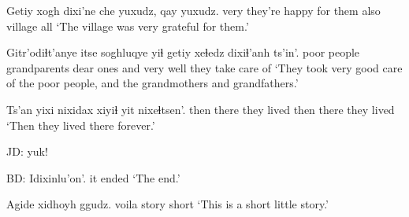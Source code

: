\documentclass[12pt]{article}
\begin{document}
\gll Getiy {xogh dixi'ne}           che yuxudz, qay yuxudz.
very  {they're happy for them} also  {}   village all
\glt `The village was very grateful for them.'
\glend

\gll Gitr'odiɬt'anye itse                          soghluqye yiɬ  getiy xeɬedz dixiɬ'anh ts'in'.
{poor people}   grandparents {dear ones} and very  well   {they take care of}
\glt `They took very good care of the poor people, and the grandmothers and grandfathers.'
\glend

\gll Ts'an yixi nixidax    xiyiɬ yit   nixeɬtsen'.
then there {they lived} then  there {they lived}
\glt `Then they lived there forever.'
\glend

JD:  yuk!

BD:  
\gll Idixinlu'on'.
{{it ended}}
\glt `The end.'
\glend

\gll Agide xidhoyh ggudz.
voila story   short
\glt `This is a short little story.'
\glend
\end{document}
